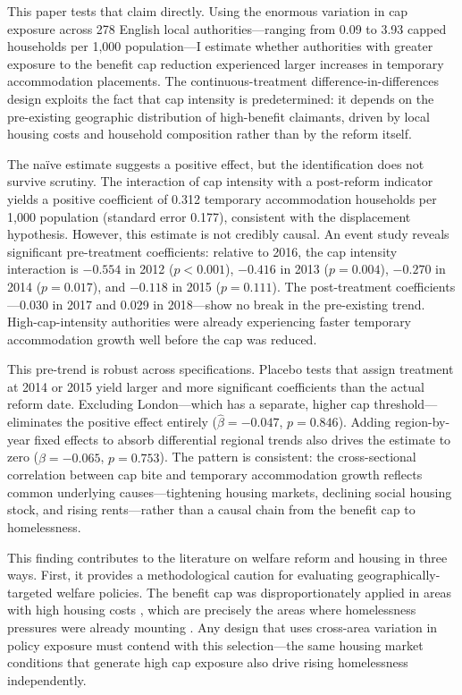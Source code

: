 \documentclass[12pt]{article}
\begin{document}
This paper tests that claim directly. Using the enormous variation in cap exposure across 278 English local authorities---ranging from 0.09 to 3.93 capped households per 1,000 population---I estimate whether authorities with greater exposure to the benefit cap reduction experienced larger increases in temporary accommodation placements. The continuous-treatment difference-in-differences design exploits the fact that cap intensity is predetermined: it depends on the pre-existing geographic distribution of high-benefit claimants, driven by local housing costs and household composition rather than by the reform itself.

The naïve estimate suggests a positive effect, but the identification does not survive scrutiny. The interaction of cap intensity with a post-reform indicator yields a positive coefficient of 0.312 temporary accommodation households per 1,000 population (standard error 0.177), consistent with the displacement hypothesis. However, this estimate is not credibly causal. An event study reveals significant pre-treatment coefficients: relative to 2016, the cap intensity interaction is $-0.554$ in 2012 ($p < 0.001$), $-0.416$ in 2013 ($p = 0.004$), $-0.270$ in 2014 ($p = 0.017$), and $-0.118$ in 2015 ($p = 0.111$). The post-treatment coefficients---0.030 in 2017 and 0.029 in 2018---show no break in the pre-existing trend. High-cap-intensity authorities were already experiencing faster temporary accommodation growth well before the cap was reduced.

This pre-trend is robust across specifications. Placebo tests that assign treatment at 2014 or 2015 yield larger and more significant coefficients than the actual reform date. Excluding London---which has a separate, higher cap threshold---eliminates the positive effect entirely ($\hat{\beta} = -0.047$, $p = 0.846$). Adding region-by-year fixed effects to absorb differential regional trends also drives the estimate to zero ($\hat{\beta} = -0.065$, $p = 0.753$). The pattern is consistent: the cross-sectional correlation between cap bite and temporary accommodation growth reflects common underlying causes---tightening housing markets, declining social housing stock, and rising rents---rather than a causal chain from the benefit cap to homelessness.

This finding contributes to the literature on welfare reform and housing in three ways. First, it provides a methodological caution for evaluating geographically-targeted welfare policies. The benefit cap was disproportionately applied in areas with high housing costs \citep{beatty2016benefit}, which are precisely the areas where homelessness pressures were already mounting \citep{fitzpatrick2019homelessness}. Any design that uses cross-area variation in policy exposure must contend with this selection---the same housing market conditions that generate high cap exposure also drive rising homelessness independently.
\end{document}

